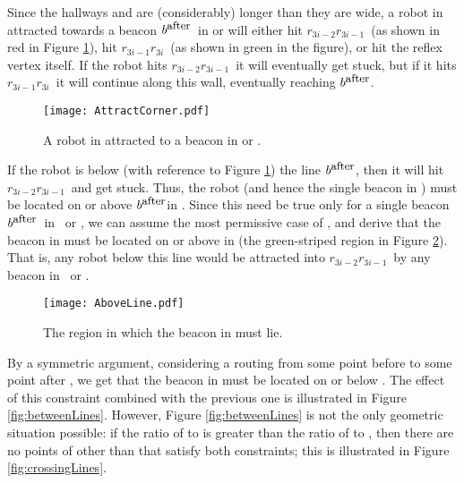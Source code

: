 \documentclass{article}
\begin{document}
\newcommand{\bafter}{\ensuremath{b^{\mbox{\small after}}}}
\newcommand{\ebad}{\ensuremath{r_{3i-2}r_{3i-1}}}
\newcommand{\egood}{\ensuremath{r_{3i-1}r_{3i}}}
Since the hallways  and  are (considerably) longer than they
are wide, a robot in  attracted towards a beacon \bafter\ in 
or  will either hit \ebad\  (as shown in red in Figure
\ref{fig:attractCorner}), hit \egood\  (as shown in green in
the figure), or hit the reflex vertex  itself.
If the robot hits \ebad\  it will eventually get stuck,
but if it hits \egood\  it will continue along this wall,
eventually reaching \bafter.

\begin{figure}[htbp] 
	\begin{center}
		\texttt{[image: AttractCorner.pdf]} 
	\end{center}
	\caption{ 
		A robot in  attracted to a beacon in  or 
		.
	}\label{fig:attractCorner}
\end{figure}

If the robot is below (with reference to Figure \ref{fig:attractCorner})
the line \bafter, then it will hit \ebad\ and get stuck.
Thus, the robot (and hence the single beacon in ) must be located
on or above \bafter in .
Since this need be true only for a single beacon \bafter\ in \ or
, we can assume the most permissive case of ,
and derive that the beacon in  must be located on or above
\mipout in  (the green-striped region in Figure
\ref{fig:aboveLine}).
That is, any robot below this line would be attracted into \ebad\ by any beacon
in \ or .

\begin{figure}[htbp] 
	\begin{center}
		\texttt{[image: AboveLine.pdf]} 
	\end{center}
	\caption{The region in which the beacon in  must lie.}
	\label{fig:aboveLine}
\end{figure}

By a symmetric argument, considering a routing from some point before  to
some point after , we get that the beacon in  must be located on or
below \mimout.  The effect of this constraint combined with the
previous one is illustrated in Figure \ref{fig:betweenLines}.
However, Figure \ref{fig:betweenLines} is not the only geometric situation
possible:
if the ratio of  to  is greater than the ratio of
 to , then there are no points of  other than
 that satisfy both constraints; this is illustrated in Figure
\ref{fig:crossingLines}.
\end{document}
